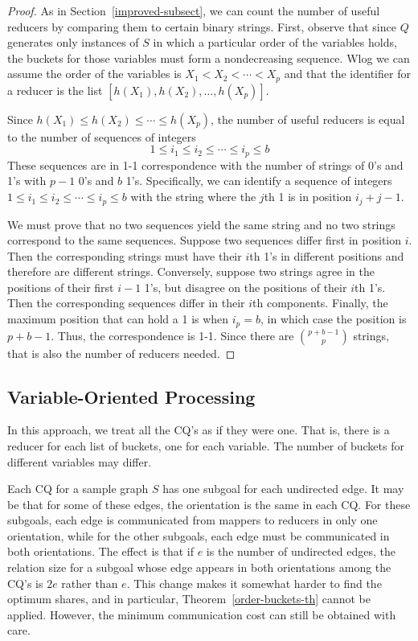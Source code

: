 \begin{proof}
As in Section~\ref{improved-subsect}, we can count the number of useful reducers by comparing them to certain binary strings.  First, observe that since $Q$ generates only instances of $S$ in which a particular order of the variables holds, the buckets for those variables must form a nondecreasing sequence.  Wlog we can assume the order of the variables is
$X_1<X_2<\cdots<X_p$
and that the identifier for a reducer is the list
$[h(X_1),h(X_2),\ldots,h(X_p)]$.

Since $h(X_1)\le h(X_2)\le\cdots\le h(X_p)$, the number of useful reducers is equal to the number of sequences of integers
$$1\le i_1\le i_2\le\cdots\le i_p\le b$$
These sequences are in 1-1 correspondence with the number of strings of 0's and 1's with $p-1$ 0's and $b$ 1's.  Specifically, we can identify a sequence of integers $1\le i_1\le i_2\le\cdots\le i_p\le b$ with the string where the $j$th 1 is in position $i_j+j-1$.

We must prove that no two sequences yield the same string and no two strings correspond to the same sequences.  Suppose two sequences differ first in position $i$.  Then the corresponding strings must have their $i$th 1's in different positions and therefore are different strings.  Conversely, suppose two strings agree in the positions of their first $i-1$ 1's, but disagree on the positions of their $i$th 1's.  Then the corresponding sequences differ in their $i$th components.  Finally, the maximum position that can hold a 1 is when $i_p=b$, in which case the position is $p+b-1$.  Thus, the correspondence is 1-1.  Since there are $\binom{p+b-1}{p}$ strings, that is also the number of reducers needed.
\end{proof}


\subsection{Variable-Oriented Processing}
\label{combine-cq-subsect}



In this approach, we treat all the CQ's as if they were one.  That is, there is a reducer for each list of buckets, one for each variable.  The number of buckets for different variables may differ.

Each CQ for a sample graph $S$ has one subgoal for each undirected edge.  It may be that for some of these edges, the orientation is the same in each CQ.  For these subgoals, each edge is communicated from mappers to reducers in only one orientation, while for the other subgoals, each edge must be communicated in both orientations.  The effect is that if $e$ is the number of undirected edges, the relation size for a subgoal whose edge appears in both orientations among the CQ's is $2e$ rather than $e$.
This change makes it somewhat harder to find the optimum shares, and in particular, Theorem~\ref{order-buckets-th} cannot be applied.  However, the minimum communication cost can still be obtained with care.

